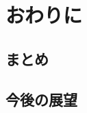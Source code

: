 \chapter{おわりに}\label{sec:Conclusion}

\section{まとめ}\label{sec:Summary}

\section{今後の展望}\label{sec:Future}